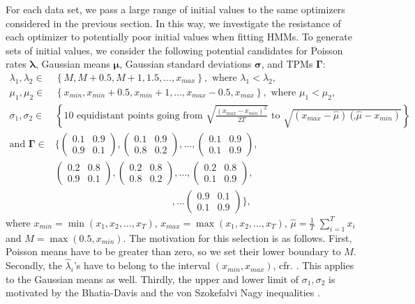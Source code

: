 \documentclass[]{interact}\usepackage[]{graphicx}\usepackage[dvipsnames]{xcolor}
\theoremstyle{plain}%
\theoremstyle{definition}
\theoremstyle{remark}
\begin{document}
For each data set, we pass a large range of initial values to the same optimizers considered in the previous section. In this way, we investigate the resistance of each optimizer to potentially poor initial values when fitting HMMs.
To generate sets of initial values, we consider the following potential candidates for Poisson rates $\bm{\lambda}$, Gaussian means $\bm{\mu}$, Gaussian standard deviations $\bm{\sigma}$, and TPMs $\bm{\Gamma}$: 
\begin{align*}
\lambda_1, \lambda_2 \in & \left\{ M, M + 0.5, M + 1, 1.5, \ldots, x_{max} \right\} ,\text{ where } \lambda_1 < \lambda_2,\\
\mu_1, \mu_2 \in & \left\{ x_{min}, x_{min} + 0.5, x_{min} + 1, \ldots, x_{max} - 0.5, x_{max} \right\}, \text{ where } \mu_1 < \mu_2,\\
\sigma_1, \sigma_2 \in & \left\{ 10 \text{ equidistant points going from } \sqrt{\frac{(x_{max} - x_{min})^2}{2T}} \text{ to } \sqrt{(x_{max} - \widehat{\mu})(\widehat{\mu} - x_{min})} \right\},\\
\text{and } \bm{\Gamma} \in
& \biggl\{
  \begin{pmatrix}
    0.1 & 0.9\\
    0.9 & 0.1
  \end{pmatrix},
  \begin{pmatrix}
    0.1 & 0.9\\
    0.8 & 0.2
  \end{pmatrix},
  \ldots,
  \begin{pmatrix}
    0.1 & 0.9\\
    0.1 & 0.9
  \end{pmatrix},
\\
& \begin{pmatrix}
    0.2 & 0.8\\
    0.9 & 0.1
  \end{pmatrix},
  \begin{pmatrix}
    0.2 & 0.8\\
    0.8 & 0.2
  \end{pmatrix},
  \ldots,
  \begin{pmatrix}
    0.2 & 0.8\\
    0.1 & 0.9
  \end{pmatrix},
\\
& \qquad \qquad \qquad \qquad \qquad \qquad, \ldots
  \begin{pmatrix}
    0.9 & 0.1\\
    0.1 & 0.9
  \end{pmatrix}
\biggl\},
\end{align*}
where $x_{min} = \min(x_1, x_2, \ldots, x_T)$, $x_{max} = \max(x_1, x_2, \ldots, x_T)$, $\widehat{\mu} = \frac{1}{T}$ $\sum_{i=1}^T x_i$ and $M = \max(0.5, x_{min})$. The motivation for this selection is as follows. First, Poisson means have to be greater than zero, so we set their lower boundary to $M$. Secondly, the $\widehat{\lambda}_i$'s have to belong to the interval $(x_{min}, x_{max})$, cfr. \citep{bohning}. This applies to the Gaussian means as well. Thirdly, the upper and lower limit of ${\sigma}_1, {\sigma}_2 $ is motivated by the Bhatia-Davis \citep{bhatia} and the von Szokefalvi Nagy inequalities \citep{nagy}.
\end{document}
